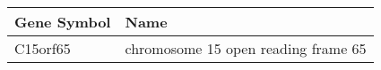\begin{tabular}{ll}
\toprule
Gene Symbol &                                Name \\
\midrule
   C15orf65 & chromosome 15 open reading frame 65 \\
\bottomrule
\end{tabular}
